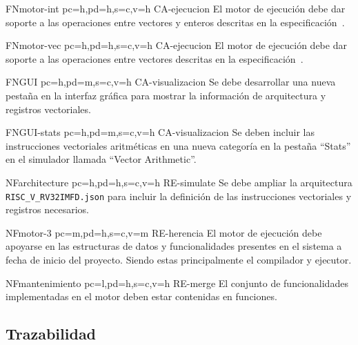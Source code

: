 \begin{softwareReq}{FN}{motor-int}
    {pc=h,pd=h,s=c,v=h}
    {CA-ejecucion}
    El motor de ejecución debe dar soporte a las operaciones entre vectores y enteros descritas en la especificación~\cite{riscv-isa2024}.
\end{softwareReq}

\begin{softwareReq}{FN}{motor-vec}
    {pc=h,pd=h,s=c,v=h}
    {CA-ejecucion}
    El motor de ejecución debe dar soporte a las operaciones entre vectores descritas en la especificación~\cite{riscv-isa2024}.
\end{softwareReq}

\begin{softwareReq}{FN}{GUI}
    {pc=h,pd=m,s=c,v=h}
    {CA-visualizacion}
    Se debe desarrollar una nueva pestaña en la interfaz gráfica para mostrar la información de arquitectura y registros vectoriales.
\end{softwareReq}

\begin{softwareReq}{FN}{GUI-stats}
    {pc=h,pd=m,s=c,v=h}
    {CA-visualizacion}
    Se deben incluir las instrucciones vectoriales aritméticas en una nueva categoría en la pestaña ``Stats'' en el simulador llamada ``Vector Arithmetic''.
\end{softwareReq}

\begin{softwareReq}{NF}{architecture}
    {pc=h,pd=h,s=c,v=h}
    {RE-simulate}
    Se debe ampliar la arquitectura \texttt{RISC\_V\_RV32IMFD.json} para incluir la definición de las instrucciones vectoriales y registros necesarios.
\end{softwareReq}

\begin{softwareReq}{NF}{motor-3}
    {pc=m,pd=h,s=c,v=m}
    {RE-herencia}
    El motor de ejecución debe apoyarse en las estructuras de datos y funcionalidades presentes en el sistema a fecha de inicio del proyecto. Siendo estas principalmente el compilador y ejecutor.
\end{softwareReq}

\begin{softwareReq}{NF}{mantenimiento}
    {pc=l,pd=h,s=c,v=h}
    {RE-merge}
    El conjunto de funcionalidades implementadas en el motor deben estar contenidas en funciones.
\end{softwareReq}


\FloatBarrier

\subsection{Trazabilidad}

